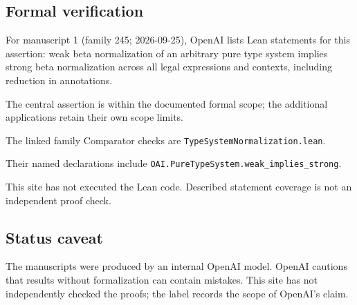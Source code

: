 \documentclass[11pt]{article}
\begin{document}
\subsection{Formal verification}
For manuscript 1 (family 245; 2026-09-25), OpenAI lists Lean statements for this assertion: weak beta normalization of an arbitrary pure type system implies strong beta normalization across all legal expressions and contexts, including reduction in annotations.

The central assertion is within the documented formal scope; the additional applications retain their own scope limits.

The linked family Comparator checks are \texttt{TypeSystemNormalization.lean}.

Their named declarations include \texttt{OAI.PureTypeSystem.weak\_implies\_strong}.

This site has not executed the Lean code. Described statement coverage is not an independent proof check.

\subsection{Status caveat}
The manuscripts were produced by an internal OpenAI model. OpenAI cautions that results without formalization can contain mistakes. This site has not independently checked the proofs; the label records the scope of OpenAI's claim.
\end{document}
